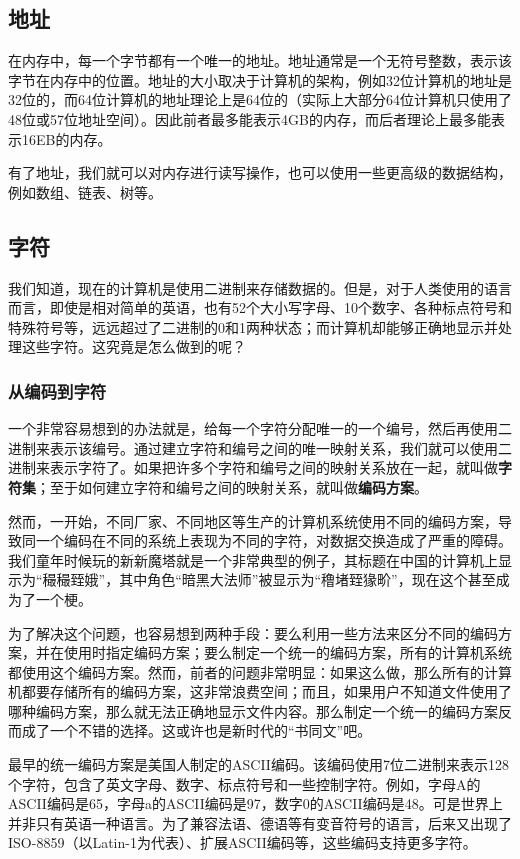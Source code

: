 \subsection{地址}

在内存中，每一个字节都有一个唯一的地址。地址通常是一个无符号整数，表示该字节在内存中的位置。地址的大小取决于计算机的架构，例如32位计算机的地址是32位的，而64位计算机的地址理论上是64位的（实际上大部分64位计算机只使用了48位或57位地址空间）。因此前者最多能表示4GB的内存，而后者理论上最多能表示16EB的内存。

有了地址，我们就可以对内存进行读写操作，也可以使用一些更高级的数据结构，例如数组、链表、树等。

\subsection{字符}\label{sec:locale}

我们知道，现在的计算机是使用二进制来存储数据的。但是，对于人类使用的语言而言，即使是相对简单的英语，也有52个大小写字母、10个数字、各种标点符号和特殊符号等，远远超过了二进制的0和1两种状态；而计算机却能够正确地显示并处理这些字符。这究竟是怎么做到的呢？

\subsubsection{从编码到字符}

一个非常容易想到的办法就是，给每一个字符分配唯一的一个编号，然后再使用二进制来表示该编号。通过建立字符和编号之间的唯一映射关系，我们就可以使用二进制来表示字符了。如果把许多个字符和编号之间的映射关系放在一起，就叫做\textbf{字符集}；至于如何建立字符和编号之间的映射关系，就叫做\textbf{编码方案}。

然而，一开始，不同厂家、不同地区等生产的计算机系统使用不同的编码方案，导致同一个编码在不同的系统上表现为不同的字符，对数据交换造成了严重的障碍。我们童年时候玩的新新魔塔就是一个非常典型的例子，其标题在中国的计算机上显示为“穝穝臸娥”，其中角色“暗黑大法师”被显示为“穞堵臸猭畍”，现在这个甚至成为了一个梗。

为了解决这个问题，也容易想到两种手段：要么利用一些方法来区分不同的编码方案，并在使用时指定编码方案；要么制定一个统一的编码方案，所有的计算机系统都使用这个编码方案。然而，前者的问题非常明显：如果这么做，那么所有的计算机都要存储所有的编码方案，这非常浪费空间；而且，如果用户不知道文件使用了哪种编码方案，那么就无法正确地显示文件内容。那么制定一个统一的编码方案反而成了一个不错的选择。这或许也是新时代的“书同文”吧。

最早的统一编码方案是美国人制定的ASCII编码。该编码使用7位二进制来表示128个字符，包含了英文字母、数字、标点符号和一些控制字符。例如，字母A的ASCII编码是65，字母a的ASCII编码是97，数字0的ASCII编码是48。可是世界上并非只有英语一种语言。为了兼容法语、德语等有变音符号的语言，后来又出现了ISO-8859（以Latin-1为代表）、扩展ASCII编码等，这些编码支持更多字符。

